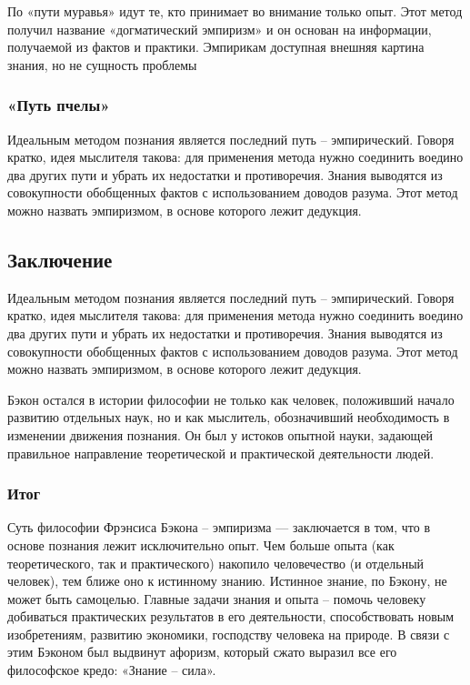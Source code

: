 \documentclass[a4paper, 14pt]{extreport}
\begin{document}
По «пути муравья» идут те, кто принимает во внимание только опыт. Этот
метод получил название «догматический эмпиризм» и он основан на
информации, получаемой из фактов и практики. Эмпирикам доступная внешняя
картина знания, но не сущность проблемы

\subsubsection{«Путь пчелы»}

Идеальным методом познания является последний путь -- эмпирический.
Говоря кратко, идея мыслителя такова: для применения метода нужно
соединить воедино два других пути и убрать их недостатки и противоречия.
Знания выводятся из совокупности обобщенных фактов с использованием
доводов разума. Этот метод можно назвать эмпиризмом, в основе которого
лежит дедукция.

\subsection{Заключение}

Идеальным методом познания является последний путь -- эмпирический.
Говоря кратко, идея мыслителя такова: для применения метода нужно
соединить воедино два других пути и убрать их недостатки и противоречия.
Знания выводятся из совокупности обобщенных фактов с использованием
доводов разума. Этот метод можно назвать эмпиризмом, в основе которого
лежит дедукция.

Бэкон остался в истории философии не только как человек, положивший
начало развитию отдельных наук, но и как мыслитель, обозначивший
необходимость в изменении движения познания. Он был у истоков опытной
науки, задающей правильное направление теоретической и практической
деятельности людей.

\subsubsection{Итог}

Суть философии Фрэнсиса Бэкона -- эмпиризма --- заключается в том, что в
основе познания лежит исключительно опыт. Чем больше опыта (как
теоретического, так и практического) накопило человечество (и отдельный
человек), тем ближе оно к истинному знанию. Истинное знание, по Бэкону,
не может быть самоцелью. Главные задачи знания и опыта -- помочь
человеку добиваться практических результатов в его деятельности,
способствовать новым изобретениям, развитию экономики, господству
человека на природе. В связи с этим Бэконом был выдвинут афоризм,
который сжато выразил все его философское кредо: «Знание -- сила».
\end{document}
